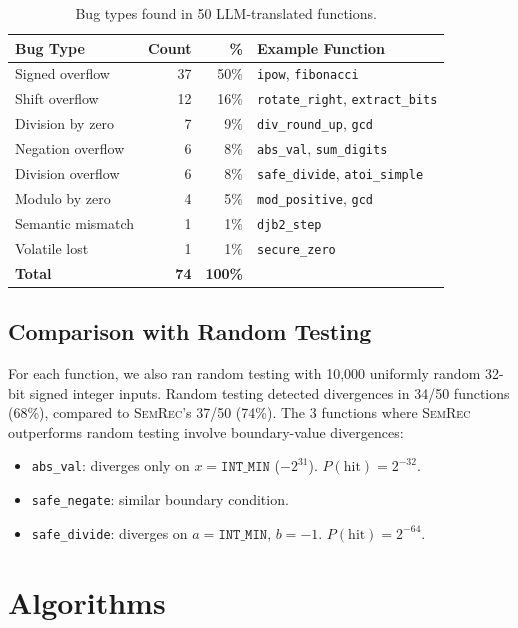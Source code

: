\documentclass[11pt,a4paper]{article}
\begin{document}
\begin{appendices}
\begin{table}[h]
\centering
\small
\caption{Bug types found in 50 LLM-translated functions.}
\label{tab:bug-types}
\begin{tabular}{@{}lrrl@{}}
\toprule
Bug Type & Count & \% & Example Function \\
\midrule
Signed overflow & 37 & 50\% & \texttt{ipow}, \texttt{fibonacci} \\
Shift overflow & 12 & 16\% & \texttt{rotate\_right}, \texttt{extract\_bits} \\
Division by zero & 7 & 9\% & \texttt{div\_round\_up}, \texttt{gcd} \\
Negation overflow & 6 & 8\% & \texttt{abs\_val}, \texttt{sum\_digits} \\
Division overflow & 6 & 8\% & \texttt{safe\_divide}, \texttt{atoi\_simple} \\
Modulo by zero & 4 & 5\% & \texttt{mod\_positive}, \texttt{gcd} \\
Semantic mismatch & 1 & 1\% & \texttt{djb2\_step} \\
Volatile lost & 1 & 1\% & \texttt{secure\_zero} \\
\midrule
\textbf{Total} & \textbf{74} & \textbf{100\%} & \\
\bottomrule
\end{tabular}
\end{table}

\subsection{Comparison with Random Testing}

For each function, we also ran random testing with 10,000 uniformly
random 32-bit signed integer inputs.  Random testing detected
divergences in 34/50 functions (68\%), compared to \textsc{SemRec}'s
37/50 (74\%).  The 3 functions where \textsc{SemRec} outperforms
random testing involve boundary-value divergences:
\begin{itemize}
  \item \texttt{abs\_val}: diverges only on $x = \texttt{INT\_MIN}$
    ($-2^{31}$).  $P(\text{hit}) = 2^{-32}$.
  \item \texttt{safe\_negate}: similar boundary condition.
  \item \texttt{safe\_divide}: diverges on $a = \texttt{INT\_MIN}$,
    $b = -1$.  $P(\text{hit}) = 2^{-64}$.
\end{itemize}


\section{Algorithms}\label{app:algorithms}


\end{appendices}
\end{document}
